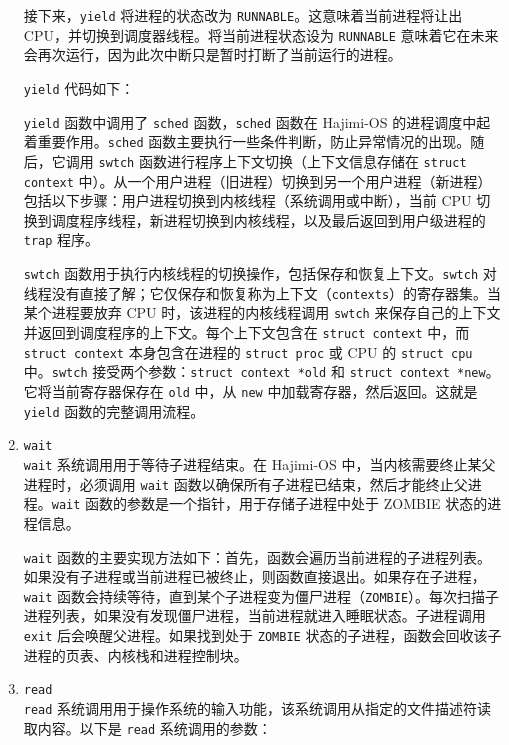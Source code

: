 \documentclass[UTF8]{article}
\begin{document}
\begin{enumerate}
        接下来，\texttt{yield} 将进程的状态改为 \texttt{RUNNABLE}。这意味着当前进程将让出 CPU，并切换到调度器线程。将当前进程状态设为 \texttt{RUNNABLE} 意味着它在未来会再次运行，因为此次中断只是暂时打断了当前运行的进程。

        \texttt{yield} 代码如下：
        

        \texttt{yield} 函数中调用了 \texttt{sched} 函数，\texttt{sched} 函数在 Hajimi-OS 的进程调度中起着重要作用。\texttt{sched} 函数主要执行一些条件判断，防止异常情况的出现。随后，它调用 \texttt{swtch} 函数进行程序上下文切换（上下文信息存储在 \texttt{struct context} 中）。从一个用户进程（旧进程）切换到另一个用户进程（新进程）包括以下步骤：用户进程切换到内核线程（系统调用或中断），当前 CPU 切换到调度程序线程，新进程切换到内核线程，以及最后返回到用户级进程的 \texttt{trap} 程序。

        \texttt{swtch} 函数用于执行内核线程的切换操作，包括保存和恢复上下文。\texttt{swtch} 对线程没有直接了解；它仅保存和恢复称为上下文（\texttt{contexts}）的寄存器集。当某个进程要放弃 CPU 时，该进程的内核线程调用 \texttt{swtch} 来保存自己的上下文并返回到调度程序的上下文。每个上下文包含在 \texttt{struct context} 中，而 \texttt{struct context} 本身包含在进程的 \texttt{struct proc} 或 CPU 的 \texttt{struct cpu} 中。\texttt{swtch} 接受两个参数：\texttt{struct context *old} 和 \texttt{struct context *new}。它将当前寄存器保存在 \texttt{old} 中，从 \texttt{new} 中加载寄存器，然后返回。这就是 \texttt{yield} 函数的完整调用流程。

  \item \texttt{wait\\} \texttt{wait} 系统调用用于等待子进程结束。在 Hajimi-OS 中，当内核需要终止某父进程时，必须调用 \texttt{wait} 函数以确保所有子进程已结束，然后才能终止父进程。\texttt{wait} 函数的参数是一个指针，用于存储子进程中处于 ZOMBIE 状态的进程信息。

        \texttt{wait} 函数的主要实现方法如下：首先，函数会遍历当前进程的子进程列表。如果没有子进程或当前进程已被终止，则函数直接退出。如果存在子进程，\texttt{wait} 函数会持续等待，直到某个子进程变为僵尸进程（\texttt{ZOMBIE}）。每次扫描子进程列表，如果没有发现僵尸进程，当前进程就进入睡眠状态。子进程调用 \texttt{exit} 后会唤醒父进程。如果找到处于 \texttt{ZOMBIE} 状态的子进程，函数会回收该子进程的页表、内核栈和进程控制块。

  \item \texttt{read\\} \texttt{read} 系统调用用于操作系统的输入功能，该系统调用从指定的文件描述符读取内容。以下是 \texttt{read} 系统调用的参数：


\end{enumerate}
\end{document}
